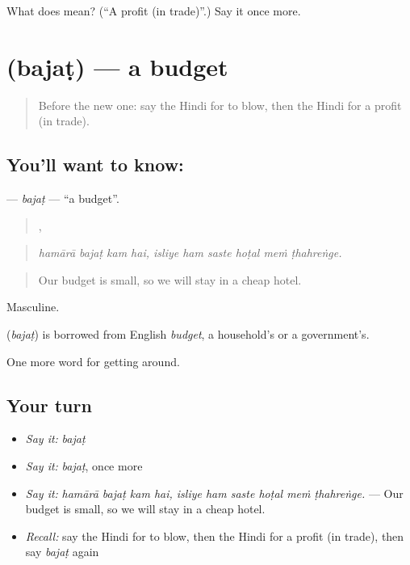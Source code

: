 \begin{tcolorbox}[breakable,colback=teal!4,colframe=teal!35!black,title={Before you move on}]
What does  mean? (\textquotedblleft{}A profit (in trade)\textquotedblright{}.) Say it once more.
\end{tcolorbox}
\section[\texorpdfstring{\hi{बजट} (bajaṭ)}{बजट (bajaṭ)}]{ (bajaṭ) — a budget}

\label{lesson:HI-C428-bajat}



\begin{quote}
Before the new one: say the Hindi for to blow, then the Hindi for a profit (in trade).
\end{quote}

\subsection*{You'll want to know: }
\textbf{} — \emph{bajaṭ} — \textquotedblleft{}a budget\textquotedblright{}.

\begin{quote}
   ,      
\end{quote}

\begin{quote}
\emph{hamārā bajaṭ kam hai, isliye ham saste hoṭal meṁ ṭhahreṅge.}
\end{quote}

\begin{quote}
Our budget is small, so we will stay in a cheap hotel.
\end{quote}

Masculine.

\begin{cousinweb}
\textbf{} (\emph{bajaṭ}) is borrowed from English \emph{budget}, a household's or a government's.
\end{cousinweb}

\begin{grammarlens}[title={What you've built}]
One more word for getting around.
\end{grammarlens}

\subsection*{Your turn}
\begin{itemize}
\raggedright
  \item \emph{Say it:} \emph{bajaṭ}
  \item \emph{Say it:} \emph{bajaṭ}, once more
  \item \emph{Say it:} \emph{hamārā bajaṭ kam hai, isliye ham saste hoṭal meṁ ṭhahreṅge.} — Our budget is small, so we will stay in a cheap hotel.
  \item \emph{Recall:} say the Hindi for to blow, then the Hindi for a profit (in trade), then say \emph{bajaṭ} again
\end{itemize}

